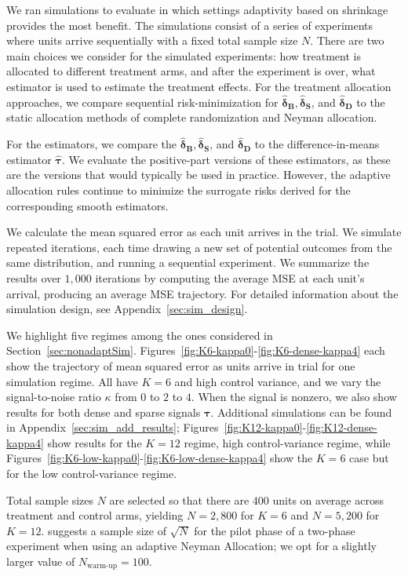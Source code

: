 \documentclass{article}
\newcommand{\bstau}{\boldsymbol \tau}
\newcommand{\hbstau}{\boldsymbol{\hat \tau}}
\newcommand{\bsdeltad}{\boldsymbol{\hat \delta_{\textbf{D}}}}
\newcommand{\bsdeltb}{\boldsymbol {\hat \delta_B}}
\newcommand{\bsdelts}{\boldsymbol {\hat \delta_S}}
\begin{document}
We ran simulations to evaluate in which settings adaptivity based on shrinkage provides the most benefit. The simulations consist of a series of experiments where units arrive sequentially with a fixed total sample size $N$. There are two main choices we consider for the simulated experiments: how treatment is allocated to different treatment arms, and after the experiment is over, what estimator is used to estimate the treatment effects. For the treatment allocation approaches, we compare sequential risk-minimization for $\bsdeltb, \bsdelts$, and $\bsdeltad$ to the static allocation methods of complete randomization and Neyman allocation. 

For the estimators, we compare the $\bsdeltb, \bsdelts$, and $\bsdeltad$  to the difference-in-means estimator $\hbstau$. We evaluate the positive-part versions of these estimators, as these are the versions that would typically be used in practice. However, the adaptive allocation rules continue to minimize the surrogate risks derived for the corresponding smooth estimators.

We calculate the mean squared error as each unit arrives in the trial. We simulate repeated iterations, each time drawing a new set of potential outcomes from the same distribution, and running a sequential experiment. 
We summarize the results over $1,000$ iterations by computing the average MSE at each unit's arrival, producing an average MSE trajectory. For detailed information about the simulation design, see Appendix~\ref{sec:sim_design}.

We highlight five regimes among the ones considered in Section~\ref{sec:nonadaptSim}. Figures~\ref{fig:K6-kappa0}-\ref{fig:K6-dense-kappa4} each show the trajectory of mean squared error as units arrive in trial for one simulation regime. All have $K=6$ and high control variance, and we vary the signal-to-noise ratio $\kappa$ from $0$ to $2$ to $4$. When the signal is nonzero, we also show results for both dense and sparse signals $\bstau$. Additional simulations can be found in Appendix~\ref{sec:sim_add_results}; 
Figures~\ref{fig:K12-kappa0}-\ref{fig:K12-dense-kappa4} show results for the $K = 12$ regime, high control-variance regime, while Figures~\ref{fig:K6-low-kappa0}-\ref{fig:K6-low-dense-kappa4} show the $K = 6$ case but for the low control-variance regime. 

Total sample sizes $N$ are selected so that there are $400$ units on average across treatment and control arms, yielding $N = 2,800$ for $K = 6$ and $N = 5,200$ for $K = 12$. \cite{zhao2023adaptive} suggests a sample size of $\sqrt{N}$ for the pilot phase of a two-phase experiment when using an adaptive Neyman Allocation; we opt for a slightly larger value of $N_{\text{warm-up}} = 100$. 
\end{document}
